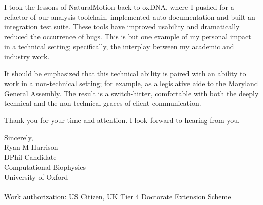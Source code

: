 \documentclass{../res}
\begin{document}
\begin{sloppypar}
\begin{resume}
I took the lessons of NaturalMotion back to oxDNA, where I pushed for a refactor of our analysis toolchain, implemented auto-documentation and built an integration test suite. These tools have improved usability and dramatically reduced the occurrence of bugs. This is but one example of my personal impact in a technical setting; specifically, the interplay between my academic and industry work.

It should be emphasized that this technical ability is paired with an ability to work in a non-technical setting; for example, as a legislative aide to the Maryland General Assembly. The result is a switch-hitter, comfortable with both the deeply technical and the non-technical graces of client communication.

Thank you for your time and attention. I look forward to hearing from you.

Sincerely, \\
Ryan M Harrison \\ 
DPhil Candidate \\
Computational Biophysics \\
University of Oxford  \\ \\
Work authorization: US Citizen, UK Tier 4 Doctorate Extension Scheme
\end{resume} 
\end{sloppypar}
\end{document}
